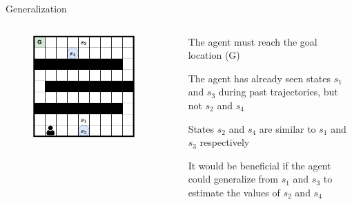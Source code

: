 \begin{frame}{Generalization}

\begin{columns}
    \begin{column}{0.4\textwidth}
        \begin{figure}
            \centering
            \includegraphics[width = 0.9\textwidth, keepaspectratio]{images/chapter_7/maze.pdf}
        \end{figure}
    \end{column}
    \begin{column}{0.6\textwidth}
        \blist
            \item The agent must reach the goal location (G)
            \item The agent has already seen states $s_1$ and $s_3$ during past trajectories, but not $s_2$ and $s_4$
            \item States $s_2$ and $s_4$ are similar to $s_1$ and $s_3$ respectively
            \item It would be beneficial if the agent could generalize from $s_1$ and $s_3$ to estimate the values of $s_2$ and $s_4$
        \elist 
    \end{column}
\end{columns}
\end{frame}

